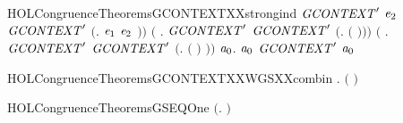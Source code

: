 \begin{SaveVerbatim}{HOLCongruenceTheoremsGCONTEXTXXstrongind}
            \ensuremath{\HOLBoundVar{GCONTEXT}\sp{\prime}} \ensuremath{\HOLBoundVar{e}\sb{\mathrm{2}}} \HOLSymConst{\HOLTokenImp{}}
            \ensuremath{\HOLBoundVar{GCONTEXT}\sp{\prime}} \ensuremath{(}\HOLTokenLambda{}. \ensuremath{\HOLBoundVar{e}\sb{\mathrm{1}}}  \HOLSymConst{\ensuremath{\mid}} \ensuremath{\HOLBoundVar{e}\sb{\mathrm{2}}} \ensuremath{)}\ensuremath{)} \HOLSymConst{\HOLTokenConj{}}
       \ensuremath{(}\HOLSymConst{\HOLTokenForall{}} .
              \HOLSymConst{\HOLTokenConj{}} \ensuremath{\HOLBoundVar{GCONTEXT}\sp{\prime}}  \HOLSymConst{\HOLTokenImp{}}
            \ensuremath{\HOLBoundVar{GCONTEXT}\sp{\prime}} \ensuremath{(}\HOLTokenLambda{}.   \ensuremath{(} \ensuremath{)}\ensuremath{)}\ensuremath{)} \HOLSymConst{\HOLTokenConj{}}
       \ensuremath{(}\HOLSymConst{\HOLTokenForall{}} .
              \HOLSymConst{\HOLTokenConj{}} \ensuremath{\HOLBoundVar{GCONTEXT}\sp{\prime}}  \HOLSymConst{\HOLTokenImp{}}
            \ensuremath{\HOLBoundVar{GCONTEXT}\sp{\prime}} \ensuremath{(}\HOLTokenLambda{}.  \ensuremath{(} \ensuremath{)} \ensuremath{)}\ensuremath{)} \HOLSymConst{\HOLTokenImp{}}
       \HOLSymConst{\HOLTokenForall{}}\ensuremath{\HOLBoundVar{a}\sb{\mathrm{0}}}.  \ensuremath{\HOLBoundVar{a}\sb{\mathrm{0}}} \HOLSymConst{\HOLTokenImp{}} \ensuremath{\HOLBoundVar{GCONTEXT}\sp{\prime}} \ensuremath{\HOLBoundVar{a}\sb{\mathrm{0}}}
\end{SaveVerbatim}
\newcommand{\HOLCongruenceTheoremsGCONTEXTXXstrongind}{\UseVerbatim{HOLCongruenceTheoremsGCONTEXTXXstrongind}}
\begin{SaveVerbatim}{HOLCongruenceTheoremsGCONTEXTXXWGSXXcombin}
\HOLTokenTurnstile{} \HOLSymConst{\HOLTokenForall{}} .   \HOLSymConst{\HOLTokenConj{}}   \HOLSymConst{\HOLTokenImp{}}  \ensuremath{(} \HOLConst{\HOLTokenCompose} \ensuremath{)}
\end{SaveVerbatim}
\newcommand{\HOLCongruenceTheoremsGCONTEXTXXWGSXXcombin}{\UseVerbatim{HOLCongruenceTheoremsGCONTEXTXXWGSXXcombin}}
\begin{SaveVerbatim}{HOLCongruenceTheoremsGSEQOne}
\HOLTokenTurnstile{}  \ensuremath{(}\HOLTokenLambda{}. \ensuremath{)}
\end{SaveVerbatim}

